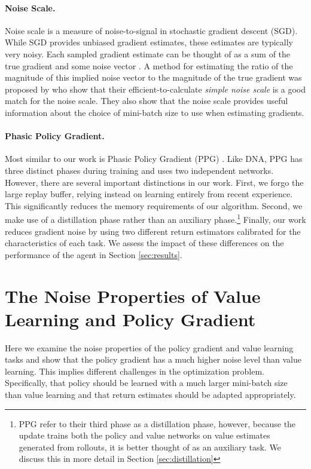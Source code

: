 \documentclass{article}
\begin{document}
\paragraph{Noise Scale.} Noise scale is a measure of noise-to-signal in stochastic gradient descent (SGD). While SGD provides unbiased gradient estimates, these estimates are typically very noisy. Each sampled gradient estimate  can be thought of as a sum of the true gradient  and some noise vector . A method for estimating the ratio of the magnitude of this implied noise vector to the magnitude of the true gradient was proposed by \cite{mccandlish2018empirical} who show that their efficient-to-calculate \textit{simple noise scale} is a good match for the noise scale. They also show that the noise scale provides useful information about the choice of mini-batch size to use when estimating gradients.

\paragraph{Phasic Policy Gradient.} Most similar to our work is Phasic Policy Gradient (PPG) \cite{cobbe2021phasic}. Like DNA, PPG has three distinct phases during training and uses two independent networks. However, there are several important distinctions in our work. First, we forgo the large replay buffer, relying instead on learning entirely from recent experience. This significantly reduces the memory requirements of our algorithm. Second, we make use of a distillation phase rather than an auxiliary phase.\footnote{PPG refer to their third phase as a distillation phase, however, because the update trains both the policy and value networks on value estimates generated from rollouts, it is better thought of as an auxiliary task. We discuss this in more detail in Section \ref{sec:distillation}} Finally, our work reduces gradient noise by using two different return estimators calibrated for the characteristics of each task. We assess the impact of these differences on the performance of the agent in Section \ref{sec:results}.

\section{The Noise Properties of Value Learning and Policy Gradient}
\label{sec:noise}

Here we examine the noise properties of the policy gradient and value learning tasks and show that the policy gradient has a much higher noise level than value learning. This implies different challenges in the optimization problem. Specifically, that policy should be learned with a much larger mini-batch size than value learning and that return estimates should be adapted appropriately.
\end{document}
